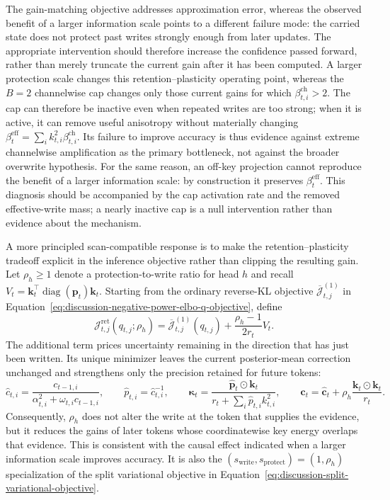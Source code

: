 \documentclass[11pt]{article}
\newcommand{\vct}[1]{\boldsymbol{#1}}
\newcommand{\diag}{\operatorname{diag}}
\begin{document}
The gain-matching objective addresses approximation error, whereas the observed benefit of a
larger information scale points to a different failure mode: the carried state does not protect
past writes strongly enough from later updates. The appropriate intervention should therefore
increase the confidence passed forward, rather than merely truncate the current gain after it has
been computed. A larger protection scale changes this retention--plasticity operating point,
whereas the $B=2$ channelwise cap changes only those current gains for which
$\beta_{t,i}^{\mathrm{ch}}>2$. The cap can therefore be inactive even when repeated writes are too
strong; when it is active, it can remove useful anisotropy without materially changing
$\beta_t^{\mathrm{eff}}=\sum_i k_{t,i}^2\beta_{t,i}^{\mathrm{ch}}$. Its failure to improve accuracy
is thus evidence against extreme channelwise amplification as the primary bottleneck, not against
the broader overwrite hypothesis. For the same reason, an off-key projection cannot reproduce the
benefit of a larger information scale: by construction it preserves $\beta_t^{\mathrm{eff}}$.
This diagnosis should be accompanied by the cap activation rate and the removed effective-write
mass; a nearly inactive cap is a null intervention rather than evidence about the mechanism.

A more principled scan-compatible response is to make the retention--plasticity tradeoff explicit
in the inference objective rather than clipping the resulting gain. Let
$\rho_h\geq1$ denote a protection-to-write ratio for head $h$ and recall
$V_t=\vct{k}_t^\top\diag(\vct{p}_t)\vct{k}_t$. Starting from the ordinary reverse-KL objective
$\overline{\mathcal{J}}_{t,j}^{(1)}$ in
Equation~\eqref{eq:discussion-negative-power-elbo-q-objective}, define
\begin{equation}
  \mathcal{J}_{t,j}^{\mathrm{ret}}(q_{t,j};\rho_h)
  =\overline{\mathcal{J}}_{t,j}^{(1)}(q_{t,j})
   +\frac{\rho_h-1}{2r_t}V_t.
  \label{eq:discussion-retention-objective}
\end{equation}
The additional term prices uncertainty remaining in the direction that has just been written. Its
unique minimizer leaves the current posterior-mean correction unchanged and strengthens
only the precision retained for future tokens:
\begin{equation}
  \widehat c_{t,i}
  =\frac{c_{t-1,i}}
    {\alpha_{t,i}^2+\omega_{t,i}c_{t-1,i}},
  \qquad
  \widehat p_{t,i}=\widehat c_{t,i}^{-1},
  \qquad
  \vct{\kappa}_t
  =\frac{\widehat{\vct{p}}_t\odot\vct{k}_t}
    {r_t+\sum_i\widehat p_{t,i}k_{t,i}^2},
  \qquad
  \vct{c}_t
  =\widehat{\vct{c}}_t
   +\rho_h\frac{\vct{k}_t\odot\vct{k}_t}{r_t}.
  \label{eq:discussion-protection-recurrence}
\end{equation}
Consequently, $\rho_h$ does not alter the write at the token that supplies the evidence, but it
reduces the gains of later tokens whose coordinatewise key energy overlaps that evidence. This is
consistent with the causal effect indicated when a larger information scale improves accuracy. It
is also the $(s_{\mathrm{write}},s_{\mathrm{protect}})=(1,\rho_h)$ specialization of the split
variational objective in Equation~\eqref{eq:discussion-split-variational-objective}.
\end{document}

